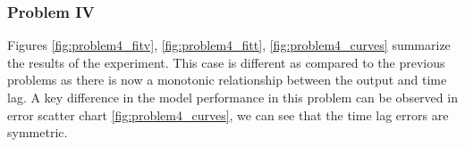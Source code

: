 \documentclass[envcountsect,runningheads]{llncs}
\theoremstyle{etoile}
\begin{document}


\subsubsection{Problem IV}

Figures \ref{fig:problem4_fitv}, \ref{fig:problem4_fitt}, \ref{fig:problem4_curves} summarize 
the results of the experiment. This case is different as compared to the previous problems as there 
is now a monotonic relationship between the output and time lag. A key difference in the model 
performance in this problem can be observed in error scatter chart \ref{fig:problem4_curves}, 
we can see that the time lag errors are symmetric.
\end{document}
